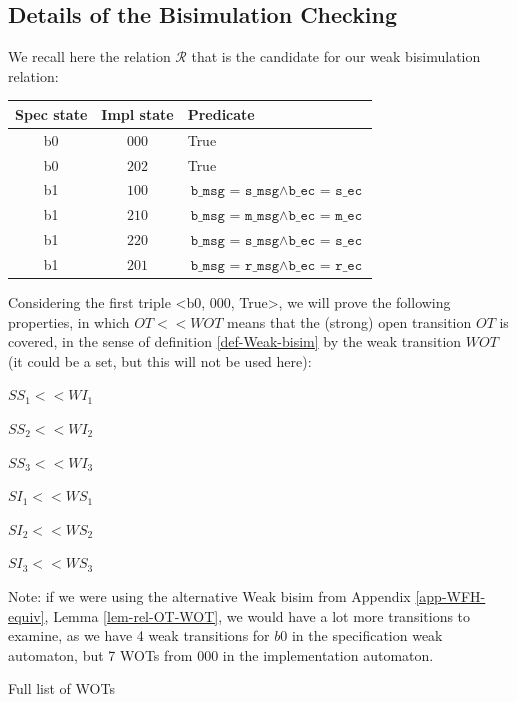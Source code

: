 \documentclass{lmcs}
\begin{document}
        \subsection{Details of the Bisimulation Checking}
         
We recall here the relation $\mathcal{R}$ that is the candidate for our weak bisimulation relation:

\bigskip
  \begin{tabular}{|c|c|l|}
\hline
    Spec state & Impl state & Predicate\\
    \hline
    b0 & $000$ & True\\
    b0 & $202$ & True\\
    b1 & $100$ & $\texttt{b\_msg = s\_msg} \land \texttt{b\_ec = s\_ec}$\\
    b1 & $210$ & $\texttt{b\_msg = m\_msg} \land \texttt{b\_ec = m\_ec}$\\
    b1 & $220$ & $\texttt{b\_msg = s\_msg} \land \texttt{b\_ec = s\_ec}$\\
    b1 & $201$ & $\texttt{b\_msg = r\_msg} \land \texttt{b\_ec = r\_ec}$\\
    \hline
    \end{tabular}


\bigskip
Considering the first triple <b0, 000, True>, we will prove the following properties, in which $OT<<WOT$ means that the (strong) open transition $OT$ is covered, in the sense of definition \ref{def-Weak-bisim} by the weak transition $WOT$ (it could be a set, but this will not be used here):

\bigskip
$SS_1 << WI_1$

$SS_2 << WI_2$

$SS_3 << WI_3$

\smallskip
$SI_1 << WS_1$

$SI_2 << WS_2$

$SI_3 << WS_3$
         
         Note: if we were using the alternative Weak bisim from Appendix \ref{app-WFH-equiv}, Lemma \ref{lem-rel-OT-WOT}, we would have a lot more transitions to examine, as we  have 4 weak transitions for $b0$ in the specification weak automaton, but 7 WOTs from 000 in the implementation automaton.
         
       Full list of WOTs


         
\end{document}
